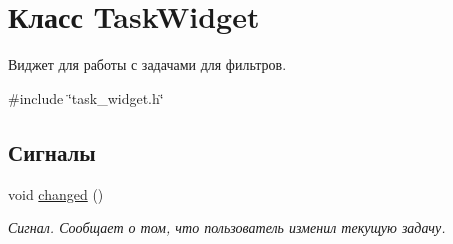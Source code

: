 \hypertarget{class_task_widget}{}\section{Класс Task\+Widget}
\label{class_task_widget}


Виджет для работы с задачами для фильтров.  




{\ttfamily \#include \char`\"{}task\+\_\+widget.\+h\char`\"{}}

\subsection*{Сигналы}
\begin{DoxyCompactItemize}
\item 
\hypertarget{class_task_widget_a881ad67de3b3b2171820b7068fc97714}{}\label{class_task_widget_a881ad67de3b3b2171820b7068fc97714} 
void \hyperlink{class_task_widget_a881ad67de3b3b2171820b7068fc97714}{changed} ()
\begin{DoxyCompactList}\small\item\em Сигнал. Сообщает о том, что пользователь изменил текущую задачу. \end{DoxyCompactList}\end{DoxyCompactItemize}
